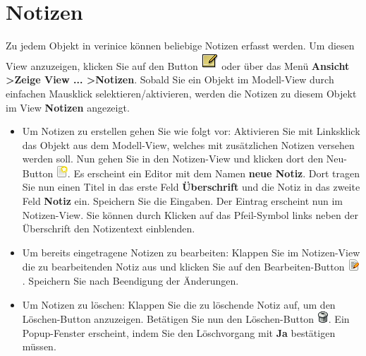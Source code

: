 \documentclass[a4paper,10pt]{book}
\begin{document}
\section{Notizen}
Zu jedem Objekt in verinice können beliebige Notizen erfasst werden. Um diesen View anzuzeigen, klicken Sie auf den Button \includegraphics[height=2ex]{Icon/Notizen.png}
oder über das Menü \textbf{Ansicht \textgreater Zeige View ... \textgreater Notizen}. Sobald Sie ein Objekt im Modell-View durch einfachen Mausklick selektieren/aktivieren,
werden die Notizen zu diesem Objekt im View \textbf{Notizen} angezeigt.
\begin{itemize}
 \item Um Notizen zu erstellen gehen Sie wie folgt vor: Aktivieren Sie mit Linksklick das Objekt aus dem Modell-View, welches mit
zusätzlichen Notizen versehen werden soll. Nun gehen Sie in den Notizen-View und klicken dort den Neu-Button \includegraphics[height=2ex]{Icon/Oeffnen.png}. Es erscheint ein
Editor mit dem Namen \textbf{neue Notiz}. Dort tragen Sie nun einen Titel in das erste Feld \textbf{Überschrift} und die Notiz in das zweite Feld \textbf{Notiz} ein.
Speichern Sie die Eingaben. Der Eintrag erscheint nun im Notizen-View. Sie können durch Klicken auf das Pfeil-Symbol links neben der Überschrift
den Notizentext einblenden.
\item Um bereits eingetragene Notizen zu bearbeiten: Klappen Sie im Notizen-View die zu bearbeitenden Notiz aus und klicken Sie auf den
Bearbeiten-Button \includegraphics[height=2ex]{Icon/Edit.png}. Speichern Sie nach Beendigung der Änderungen.
\item Um Notizen zu löschen: Klappen Sie die zu löschende Notiz auf, um den Löschen-Button anzuzeigen. Betätigen Sie nun den Löschen-Button \includegraphics[height=2ex]{Icon/Delete.png}.
Ein Popup-Fenster erscheint, indem Sie den Löschvorgang mit \textbf{Ja} bestätigen müssen.
\end{itemize}
\end{document}
